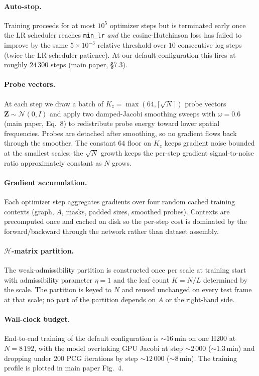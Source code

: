 \documentclass[acmtog,anonymous,review]{acmart}
\begin{document}
\paragraph{Auto-stop.}
Training proceeds for at most $10^5$ optimizer steps but is terminated early once
the LR scheduler reaches \texttt{min\_lr} \emph{and} the cosine-Hutchinson loss
has failed to improve by the same $5\!\times\!10^{-3}$ relative threshold over
$10$ consecutive log steps (twice the LR-scheduler patience). At our default
configuration this fires at roughly $24\,300$ steps (main paper, \S7.3).

\paragraph{Probe vectors.}
At each step we draw a batch of $K_z\!=\!\max(64, \lceil\sqrt{N}\rceil)$ probe
vectors $\mathbf{Z}\!\sim\!\mathcal{N}(0, I)$ and apply two damped-Jacobi
smoothing sweeps with $\omega\!=\!0.6$ (main paper, Eq.~8) to redistribute probe
energy toward lower spatial frequencies. Probes are detached after smoothing, so
no gradient flows back through the smoother. The constant $64$ floor on $K_z$
keeps gradient noise bounded at the smallest scales; the $\sqrt{N}$ growth keeps
the per-step gradient signal-to-noise ratio approximately constant as $N$ grows.

\paragraph{Gradient accumulation.}
Each optimizer step aggregates gradients over four random cached training
contexts (graph, $A$, masks, padded sizes, smoothed probes). Contexts are
precomputed once and cached on disk so the per-step cost is dominated by the
forward/backward through the network rather than dataset assembly.

\paragraph{$\mathcal{H}$-matrix partition.}
The weak-admissibility partition is constructed once per scale at training start
with admissibility parameter $\eta\!=\!1$ and the leaf count $K\!=\!N/L$
determined by the scale. The partition is keyed to $N$ and reused unchanged on
every test frame at that scale; no part of the partition depends on $A$ or the
right-hand side.

\paragraph{Wall-clock budget.}
End-to-end training of the default configuration is $\sim\!16$\,min on one
H200 at $N\!=\!8\,192$, with the model overtaking GPU Jacobi at step
$\sim\!2\,000$ ($\sim\!1.3$\,min) and dropping under $200$ PCG iterations by
step $\sim\!12\,000$ ($\sim\!8$\,min). The training profile is plotted in main
paper Fig.~4.
\end{document}
